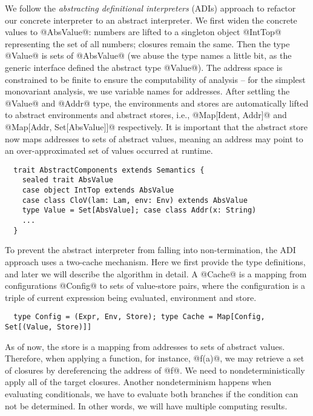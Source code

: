 We follow the \textit{abstracting definitional interpreters} (ADIs) approach
\cite{DBLP:journals/pacmpl/DaraisLNH17} to refactor our concrete interpreter to
an abstract interpreter. We first widen the concrete values to @AbsValue@: numbers
are lifted to a singleton object @IntTop@ representing the set of all numbers;
closures remain the same. Then the type @Value@ is sets of @AbsValue@ (we abuse
the type names a little bit, as the generic interface defined the abstract type
@Value@).
The address space is constrained to be finite to ensure the computability of
analysis -- for the simplest monovariant analysis, we use variable names for
addresses. After settling the @Value@ and @Addr@ type, the environments and
stores are automatically lifted to abstract environments and abstract stores,
i.e., @Map[Ident, Addr]@ and @Map[Addr, Set[AbsValue]]@ respectively.
It is important that the abstract store now maps addresses to sets of abstract
values, meaning an address may point to an over-approximated set of values
occurred at runtime.

\begin{lstlisting}
  trait AbstractComponents extends Semantics {
    sealed trait AbsValue
    case object IntTop extends AbsValue
    case class CloV(lam: Lam, env: Env) extends AbsValue
    type Value = Set[AbsValue]; case class Addr(x: String)
    ...
  }
\end{lstlisting}

To prevent the abstract interpreter from falling into non-termination, the ADI
approach uses a two-cache mechanism. Here we first provide the type
definitions, and later we will describe the algorithm in detail. A @Cache@ is a
mapping from configurations @Config@ to sets of value-store pairs, where the
configuration is a triple of current expression being evaluated, environment and
store.

\begin{lstlisting}
  type Config = (Expr, Env, Store); type Cache = Map[Config, Set[(Value, Store)]]
\end{lstlisting}

As of now, the store is a mapping from addresses to sets of abstract values.
Therefore, when applying a function, for instance, @f(a)@, we may retrieve a set
of closures by dereferencing the address of @f@. We need to nondeterministically
apply all of the target closures.
Another nondeterminism happens when evaluating conditionals, we have to evaluate
both branches if the condition can not be determined. In other words, we will
have multiple computing results.

